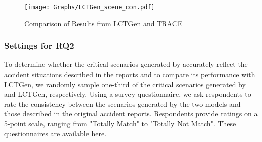 


\begin{figure}[!t]
  \centering
  \texttt{[image: Graphs/LCTGen\_scene\_con.pdf]}
  \caption{Comparison of Results from LCTGen and TRACE}
  \label{fig:results_compar}
\vspace{-4mm}
\end{figure}

\subsubsection{Settings for RQ2}
To determine whether the critical scenarios generated by {\tool} accurately reflect the accident situations described in the reports and to compare its performance with LCTGen, we randomly sample one-third of the critical scenarios generated by {\tool} and LCTGen, respectively. Using a survey questionnaire, we ask respondents to rate the consistency between the scenarios generated by the two models and those described in the original accident reports. Respondents provide ratings on a 5-point scale, ranging from "Totally Match" to "Totally Not Match". These questionnaires are available \href{https://drive.google.com/drive/folders/1te0VYByco3Xx-L8G5M9ECNS8m0pWe2rL?usp=sharing}{here}.

